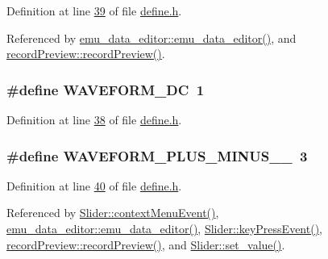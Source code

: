 Definition at line \hyperlink{a00034_source_l00039}{39} of file \hyperlink{a00034_source}{define.\+h}.



Referenced by \hyperlink{a00035_source_l00012}{emu\+\_\+data\+\_\+editor\+::emu\+\_\+data\+\_\+editor()}, and \hyperlink{a00042_source_l00011}{record\+Preview\+::record\+Preview()}.

\hypertarget{a00034_a0997727a7675c2520283e5c2b2018d7d}{
\subsubsection[{W\+A\+V\+E\+F\+O\+R\+M\+\_\+\+D\+C}]{\setlength{\rightskip}{0pt plus 5cm}\#define W\+A\+V\+E\+F\+O\+R\+M\+\_\+\+D\+C~1}}\label{a00034_a0997727a7675c2520283e5c2b2018d7d}


Definition at line \hyperlink{a00034_source_l00038}{38} of file \hyperlink{a00034_source}{define.\+h}.

\hypertarget{a00034_a0923d3b365a36e1e8c401cec964aa36f}{
\subsubsection[{W\+A\+V\+E\+F\+O\+R\+M\+\_\+\+P\+L\+U\+S\+\_\+\+M\+I\+N\+U\+S\+\_\+1\+\_\+65}]{\setlength{\rightskip}{0pt plus 5cm}\#define W\+A\+V\+E\+F\+O\+R\+M\+\_\+\+P\+L\+U\+S\+\_\+\+M\+I\+N\+U\+S\+\_\+\_~3}}\label{a00034_a0923d3b365a36e1e8c401cec964aa36f}


Definition at line \hyperlink{a00034_source_l00040}{40} of file \hyperlink{a00034_source}{define.\+h}.



Referenced by \hyperlink{a00046_source_l00309}{Slider\+::context\+Menu\+Event()}, \hyperlink{a00035_source_l00012}{emu\+\_\+data\+\_\+editor\+::emu\+\_\+data\+\_\+editor()}, \hyperlink{a00046_source_l00219}{Slider\+::key\+Press\+Event()}, \hyperlink{a00042_source_l00011}{record\+Preview\+::record\+Preview()}, and \hyperlink{a00046_source_l00102}{Slider\+::set\+\_\+value()}.

